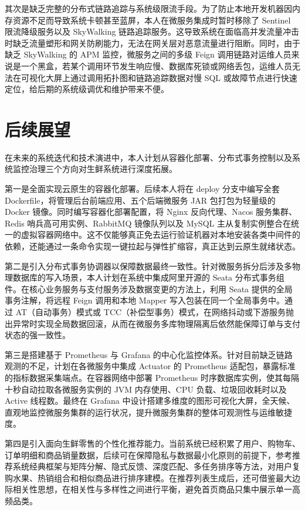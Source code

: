 其次是缺乏完整的分布式链路追踪与系统级限流手段。为了防止本地开发机器因内存资源不足而导致系统卡顿甚至蓝屏，本人在微服务集成时暂时移除了 Sentinel 限流降级服务以及 SkyWalking 链路追踪服务。这导致系统在面临高并发流量冲击时缺乏流量塑形和网关防刷能力，无法在网关层对恶意流量进行阻断。同时，由于缺乏 SkyWalking 的 APM 监控，微服务之间的多级 Feign 调用链路对运维人员来说是一个黑盒，若某个调用环节发生响应慢、数据库死锁或网络丢包，运维人员无法在可视化大屏上通过调用拓扑图和链路追踪数据对慢 SQL 或故障节点进行快速定位，给后期的系统级调优和维护带来不便。

\section{后续展望}

在未来的系统迭代和技术演进中，本人计划从容器化部署、分布式事务控制以及系统监控治理三个方向对生鲜系统进行深度拓展。

第一是全面实现云原生的容器化部署。后续本人将在 deploy 分支中编写全套 Dockerfile，将管理后台前端应用、五个后端微服务 JAR 包打包为轻量级的 Docker 镜像。同时编写容器化部署配置，将 Nginx 反向代理、Nacos 服务集群、Redis 哨兵高可用实例、RabbitMQ 镜像队列以及 MySQL 主从复制实例整合在统一的虚拟容器网络中。这不仅能够真正免去运行验证机器对本地安装各类中间件的依赖，还能通过一条命令实现一键拉起与弹性扩缩容，真正达到云原生就绪状态。

第二是引入分布式事务协调器以保障数据最终一致性。针对微服务拆分后涉及多物理数据库的写入场景，本人计划在系统中集成阿里开源的 Seata 分布式事务组件。在核心业务服务与支付服务涉及数据变更的方法上，利用 Seata 提供的全局事务注解，将远程 Feign 调用和本地 Mapper 写入包装在同一个全局事务中。通过 AT（自动事务）模式或 TCC（补偿型事务）模式，在网络抖动或下游服务抛出异常时实现全局数据回滚，从而在微服务多库物理隔离后依然能保障订单与支付状态的强一致性。

第三是搭建基于 Prometheus 与 Grafana 的中心化监控体系。针对目前缺乏链路观测的不足，计划在各微服务中集成 Actuator 的 Prometheus 适配包，暴露标准的指标数据采集端点。在容器网络中部署 Prometheus 时序数据库实例，使其每隔十秒自动拉取各微服务实例的 JVM 内存使用、CPU 负载、垃圾回收耗时以及 Active 线程数。最终在 Grafana 中设计搭建多维度的图形可视化大屏，全天候、直观地监控微服务集群的运行状况，提升微服务集群的整体可观测性与运维敏捷度。

第四是引入面向生鲜零售的个性化推荐能力。当前系统已经积累了用户、购物车、订单明细和商品销量数据，后续可在保障隐私与数据最小化原则的前提下，参考推荐系统经典框架与矩阵分解、隐式反馈、深度匹配、多任务排序等方法，对用户复购水果、热销组合和相似商品进行排序建模\cite{ricci,hu2008collaborative,rendle2009bpr,covington,cheng,he2017ncf}。在推荐列表生成后，还可借鉴最大边际相关性思想，在相关性与多样性之间进行平衡，避免首页商品只集中展示单一高频品类\cite{carbonell1998mmr}。
